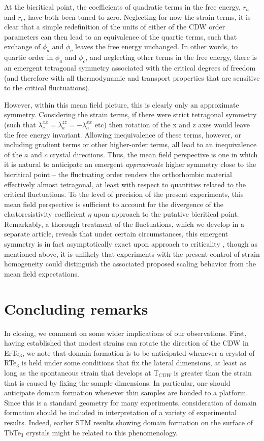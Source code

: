\documentclass[%
 reprint, %
amsmath,amssymb,
aps,
]{revtex4-2}
\begin{document}
At the bicritical point, the coefficients of quadratic terms in the free energy, $r_a$ and $r_c$, have both been tuned to zero. Neglecting for now the strain terms, it is clear that a simple redefinition of the units of either of the CDW order parameters can then lead to an equivalence of the quartic terms, such that exchange of $\phi_a$ and $\phi_c$ leaves the free energy unchanged. In other words, to quartic order in $\phi_a$ and $\phi_c$, and neglecting other terms in the free energy, there is an emergent tetragonal symmetry associated with the critical degrees of freedom (and therefore with all thermodynamic and transport properties that are sensitive to the critical fluctuations). 

However, within this mean field picture, this is clearly only an approximate symmetry. Considering the strain terms, if there were strict tetragonal symmetry (such that $\lambda_c^{xx}=\lambda_a^{zz}=-\lambda_a^{xx}$ etc) then rotation of the x and z axes would leave the free energy invariant. Allowing inequivalence of these terms, however, or including gradient terms or other higher-order terms, all lead to an inequivalence of the $a$ and $c$ crystal directions. Thus, the mean field perspective is one in which it is natural to anticipate an emergent \emph{approximate} higher symmetry close to the bicritical point – the fluctuating order renders the orthorhombic material effectively almost tetragonal, at least with respect to quantities related to the critical fluctuations. To the level of precision of the present experiments, this mean field perspective is sufficient to account for the divergence of the elastoresistivity coefficient $\eta$ upon approach to the putative bicritical point. Remarkably, a thorough treatment of the fluctuations, which we develop in a separate article, reveals that under certain circumstances, this emergent symmetry is in fact asymptotically exact upon approach to criticality \cite{Pandey2023}, though as mentioned above, it is unlikely that experiments with the present control of strain homogeneity could distinguish the associated proposed scaling behavior from the mean field expectations. 

\section{Concluding remarks}

In closing, we comment on some wider implications of our observations. First, having established that modest strains can rotate the direction of the CDW in ErTe$_3$, we note that domain formation is to be anticipated whenever a crystal of RTe$_3$ is held under some conditions that fix the lateral dimensions, at least as long as the spontaneous strain that develops at T$_{CDW}$ is greater than the strain that is caused by fixing the sample dimensions. In particular, one should anticipate domain formation whenever thin samples are bonded to a platform. Since this is a standard geometry for many experiments, consideration of domain formation should be included in interpretation of a variety of experimental results. Indeed, earlier STM results showing domain formation on the surface of TbTe$_3$ crystals might be related to this phenomenology. \cite{Fu2016}
\end{document}
